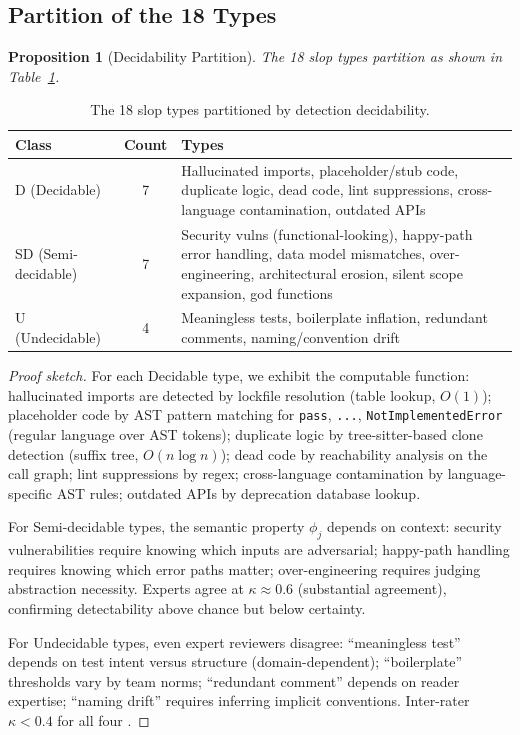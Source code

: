 \documentclass[11pt, a4paper]{article}
\newtheorem{proposition}[theorem]{Proposition}
\theoremstyle{definition}
\theoremstyle{remark}
\begin{document}
\subsection{Partition of the 18 Types}

\begin{proposition}[Decidability Partition]
\label{prop:partition}
The 18 slop types partition as shown in Table~\ref{tab:partition}.
\end{proposition}

\begin{table}[htbp]
\centering
\caption{The 18 slop types partitioned by detection decidability.}
\label{tab:partition}
\small
\begin{tabularx}{\textwidth}{l c X}
\toprule
\textbf{Class} & \textbf{Count} & \textbf{Types} \\
\midrule
D (Decidable) & 7 & Hallucinated imports, placeholder/stub code, duplicate logic, dead code, lint suppressions, cross-language contamination, outdated APIs \\
\addlinespace
SD (Semi-decidable) & 7 & Security vulns (functional-looking), happy-path error handling, data model mismatches, over-engineering, architectural erosion, silent scope expansion, god functions \\
\addlinespace
U (Undecidable) & 4 & Meaningless tests, boilerplate inflation, redundant comments, naming/convention drift \\
\bottomrule
\end{tabularx}
\end{table}

\begin{proof}[Proof sketch]
For each Decidable type, we exhibit the computable function: hallucinated imports are detected by lockfile resolution (table lookup, $O(1)$); placeholder code by AST pattern matching for \texttt{pass}, \texttt{...}, \texttt{NotImplementedError} (regular language over AST tokens); duplicate logic by tree-sitter-based clone detection (suffix tree, $O(n \log n)$); dead code by reachability analysis on the call graph; lint suppressions by regex; cross-language contamination by language-specific AST rules; outdated APIs by deprecation database lookup.

For Semi-decidable types, the semantic property $\phi_j$ depends on context: security vulnerabilities require knowing which inputs are adversarial; happy-path handling requires knowing which error paths matter; over-engineering requires judging abstraction necessity. Experts agree at $\kappa \approx 0.6$ (substantial agreement), confirming detectability above chance but below certainty.

For Undecidable types, even expert reviewers disagree: ``meaningless test'' depends on test intent versus structure (domain-dependent); ``boilerplate'' thresholds vary by team norms; ``redundant comment'' depends on reader expertise; ``naming drift'' requires inferring implicit conventions. Inter-rater $\kappa < 0.4$ for all four \citep{llmjudgetrust2024}.
\end{proof}
\end{document}
